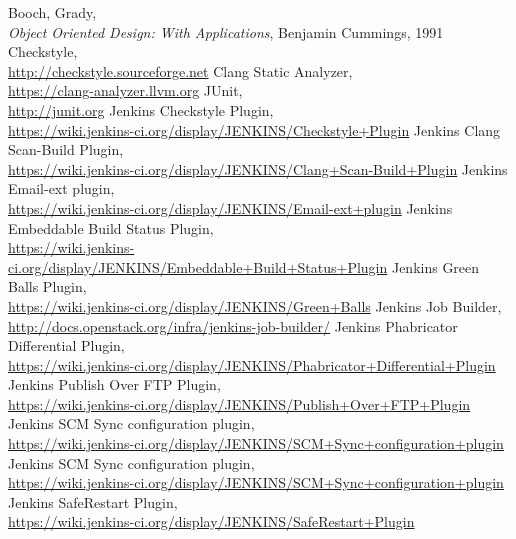 \documentclass[a4paper,twocolumn,10pt]{article}
\begin{document}
\begin{thebibliography}{999}
 Booch, Grady,\\
\textit{Object Oriented Design: With Applications}, Benjamin Cummings, 1991
 Checkstyle,\\
\url{http://checkstyle.sourceforge.net}
 Clang Static Analyzer,\\
\url{https://clang-analyzer.llvm.org}
 JUnit,\\
\url{http://junit.org}
 Jenkins Checkstyle Plugin,\\
\url{https://wiki.jenkins-ci.org/display/JENKINS/Checkstyle+Plugin}
 Jenkins Clang Scan-Build Plugin,\\
\url{https://wiki.jenkins-ci.org/display/JENKINS/Clang+Scan-Build+Plugin}
 Jenkins Email-ext plugin,\\
\url{https://wiki.jenkins-ci.org/display/JENKINS/Email-ext+plugin}
 Jenkins Embeddable Build Status Plugin,\\
\url{https://wiki.jenkins-ci.org/display/JENKINS/Embeddable+Build+Status+Plugin}
 Jenkins Green Balls Plugin,\\
\url{https://wiki.jenkins-ci.org/display/JENKINS/Green+Balls}
 Jenkins Job Builder,\\
\url{http://docs.openstack.org/infra/jenkins-job-builder/}
 Jenkins Phabricator Differential Plugin,\\
\url{https://wiki.jenkins-ci.org/display/JENKINS/Phabricator+Differential+Plugin}
 Jenkins Publish Over FTP Plugin,\\
\url{https://wiki.jenkins-ci.org/display/JENKINS/Publish+Over+FTP+Plugin}
 Jenkins SCM Sync configuration plugin,\\
\url{https://wiki.jenkins-ci.org/display/JENKINS/SCM+Sync+configuration+plugin}
 Jenkins SCM Sync configuration plugin,\\
\url{https://wiki.jenkins-ci.org/display/JENKINS/SCM+Sync+configuration+plugin}
 Jenkins SafeRestart Plugin,\\
\url{https://wiki.jenkins-ci.org/display/JENKINS/SafeRestart+Plugin}

\end{thebibliography}
\end{document}
